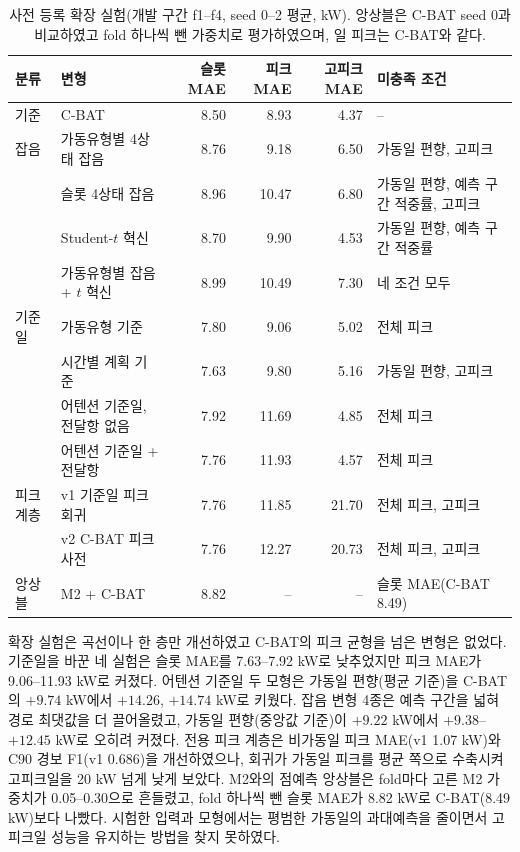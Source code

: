 \begin{table}[htbp]
\centering
\hwptablefont
\setlength{\tabcolsep}{4pt}
\caption{사전 등록 확장 실험(개발 구간 f1--f4, seed 0--2 평균, kW). 앙상블은 C-BAT seed 0과 비교하였고 fold 하나씩 뺀 가중치로 평가하였으며, 일 피크는 C-BAT와 같다.}\label{tab:ch3-ext}
\begin{tabular}{L{1.4cm}L{4.1cm}rrrL{4.1cm}}
\toprule
분류 & 변형 & 슬롯 MAE & 피크 MAE & 고피크 MAE & 미충족 조건 \\
\midrule
기준 & C-BAT & 8.50 & 8.93 & 4.37 & -- \\
\midrule
잡음 & 가동유형별 4상태 잡음 & 8.76 & 9.18 & 6.50 & 가동일 편향, 고피크 \\
 & 슬롯 4상태 잡음 & 8.96 & 10.47 & 6.80 & 가동일 편향, 예측 구간 적중률, 고피크 \\
 & Student-$t$ 혁신 & 8.70 & 9.90 & 4.53 & 가동일 편향, 예측 구간 적중률 \\
 & 가동유형별 잡음 + $t$ 혁신 & 8.99 & 10.49 & 7.30 & 네 조건 모두 \\
\midrule
기준일 & 가동유형 기준 & 7.80 & 9.06 & 5.02 & 전체 피크 \\
 & 시간별 계획 기준 & 7.63 & 9.80 & 5.16 & 가동일 편향, 고피크 \\
 & 어텐션 기준일, 전달항 없음 & 7.92 & 11.69 & 4.85 & 전체 피크 \\
 & 어텐션 기준일 + 전달항 & 7.76 & 11.93 & 4.57 & 전체 피크 \\
\midrule
피크 계층 & v1 기준일 피크 회귀 & 7.76 & 11.85 & 21.70 & 전체 피크, 고피크 \\
 & v2 C-BAT 피크 사전 & 7.76 & 12.27 & 20.73 & 전체 피크, 고피크 \\
\midrule
앙상블 & M2 + C-BAT & 8.82 & -- & -- & 슬롯 MAE(C-BAT 8.49) \\
\bottomrule
\end{tabular}
\end{table}

확장 실험은 곡선이나 한 층만 개선하였고 C-BAT의 피크 균형을 넘은 변형은 없었다. 기준일을 바꾼 네 실험은 슬롯 MAE를 7.63--7.92 kW로 낮추었지만 피크 MAE가 9.06--11.93 kW로 커졌다. 어텐션 기준일 두 모형은 가동일 편향(평균 기준)을 C-BAT의 $+9.74$ kW에서 $+14.26$, $+14.74$ kW로 키웠다. 잡음 변형 4종은 예측 구간을 넓혀 경로 최댓값을 더 끌어올렸고, 가동일 편향(중앙값 기준)이 $+9.22$ kW에서 $+9.38$--$+12.45$ kW로 오히려 커졌다. 전용 피크 계층은 비가동일 피크 MAE(v1 1.07 kW)와 C90 경보 F1(v1 0.686)을 개선하였으나, 회귀가 가동일 피크를 평균 쪽으로 수축시켜 고피크일을 20 kW 넘게 낮게 보았다. M2와의 점예측 앙상블은 fold마다 고른 M2 가중치가 0.05--0.30으로 흔들렸고, fold 하나씩 뺀 슬롯 MAE가 8.82 kW로 C-BAT(8.49 kW)보다 나빴다. 시험한 입력과 모형에서는 평범한 가동일의 과대예측을 줄이면서 고피크일 성능을 유지하는 방법을 찾지 못하였다.

